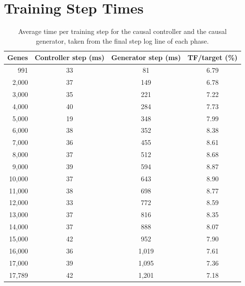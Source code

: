 \documentclass[11pt]{article}
\begin{document}
\section{Training Step Times}
\begin{table}[H]
\centering
\small
\caption{Average time per training step for the causal controller and the causal generator, taken from the final step log line of each phase.}
\label{tab:steps}
\begin{tabular}{rccc}
\toprule
Genes & Controller step (ms) & Generator step (ms) & TF/target (\%) \\
\midrule
991 & 33 & 81 & 6.79\\
2,000 & 37 & 149 & 6.78\\
3,000 & 35 & 221 & 7.22\\
4,000 & 40 & 284 & 7.73\\
5,000 & 19 & 348 & 7.99\\
6,000 & 38 & 352 & 8.38\\
7,000 & 36 & 455 & 8.61\\
8,000 & 37 & 512 & 8.68\\
9,000 & 39 & 594 & 8.87\\
10,000 & 37 & 643 & 8.90\\
11,000 & 38 & 698 & 8.77\\
12,000 & 33 & 772 & 8.59\\
13,000 & 37 & 816 & 8.35\\
14,000 & 37 & 888 & 8.07\\
15,000 & 42 & 952 & 7.90\\
16,000 & 36 & 1,019 & 7.61\\
17,000 & 39 & 1,095 & 7.36\\
17,789 & 42 & 1,201 & 7.18\\
\bottomrule
\end{tabular}
\end{table}
\end{document}
